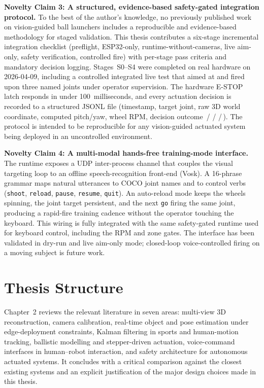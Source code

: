 \textbf{Novelty Claim 3: A structured, evidence-based safety-gated integration protocol.}
To the best of the author's knowledge, no previously published work on vision-guided ball launchers includes a reproducible and evidence-based methodology for staged validation. This thesis contributes a six-stage incremental integration checklist (preflight, ESP32-only, runtime-without-cameras, live aim-only, safety verification, controlled fire) with per-stage pass criteria and mandatory decision logging. Stages~S0--S4 were completed on real hardware on 2026-04-09, including a controlled integrated live test that aimed at and fired upon three named joints under operator supervision. The hardware E-STOP latch responds in under 100~milliseconds, and every actuation decision is recorded to a structured JSONL file (timestamp, target joint, raw 3D world coordinate, computed pitch/yaw, wheel RPM, decision outcome \,/\,\,/\,\,/\,). The protocol is intended to be reproducible for any vision-guided actuated system being deployed in an uncontrolled environment.

\textbf{Novelty Claim 4: A multi-modal hands-free training-mode interface.}
The runtime exposes a UDP inter-process channel that couples the visual targeting loop to an offline speech-recognition front-end (Vosk). A 16-phrase grammar maps natural utterances to COCO joint names and to control verbs (\texttt{shoot}, \texttt{reload}, \texttt{pause}, \texttt{resume}, \texttt{quit}). An auto-reload mode keeps the wheels spinning, the joint target persistent, and the next \texttt{go} firing the same joint, producing a rapid-fire training cadence without the operator touching the keyboard. This wiring is fully integrated with the same safety-gated runtime used for keyboard control, including the RPM and zone gates. The interface has been validated in dry-run and live aim-only mode; closed-loop voice-controlled firing on a moving subject is future work.

\section{Thesis Structure}

Chapter~2 reviews the relevant literature in seven areas: multi-view 3D reconstruction, camera calibration, real-time object and pose estimation under edge-deployment constraints, Kalman filtering in sports and human-motion tracking, ballistic modelling and stepper-driven actuation, voice-command interfaces in human--robot interaction, and safety architecture for autonomous actuated systems. It concludes with a critical comparison against the closest existing systems and an explicit justification of the major design choices made in this thesis.

